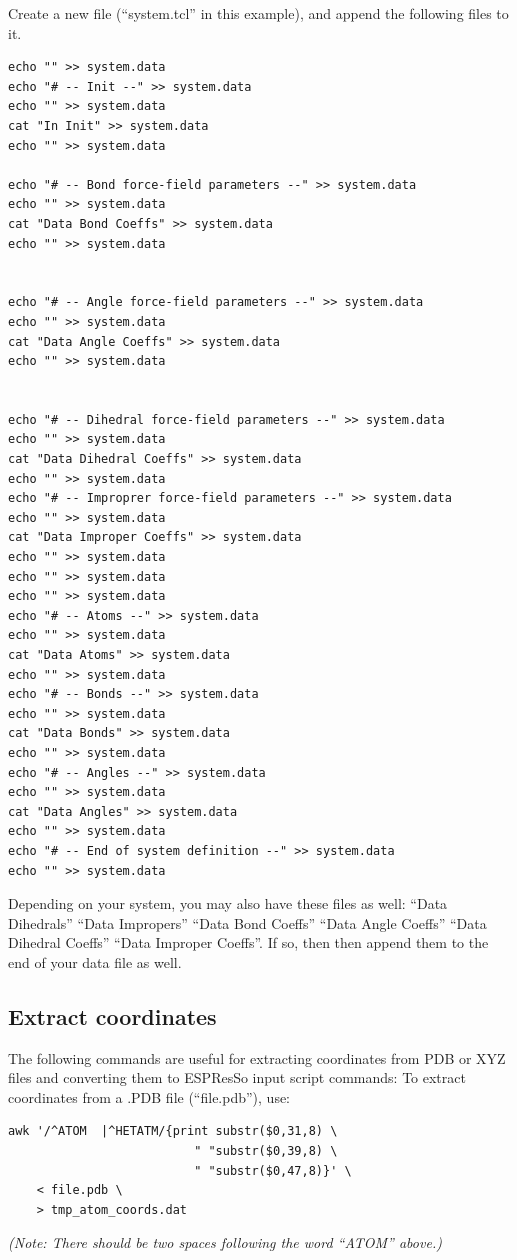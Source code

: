\documentclass[11pt]{article}
\begin{document}
Create a new file (``system.tcl'' in this example), and append the following files to it.

\begin{verbatim}
echo "" >> system.data
echo "# -- Init --" >> system.data
echo "" >> system.data
cat "In Init" >> system.data
echo "" >> system.data

echo "# -- Bond force-field parameters --" >> system.data
echo "" >> system.data
cat "Data Bond Coeffs" >> system.data
echo "" >> system.data


echo "# -- Angle force-field parameters --" >> system.data
echo "" >> system.data
cat "Data Angle Coeffs" >> system.data
echo "" >> system.data


echo "# -- Dihedral force-field parameters --" >> system.data
echo "" >> system.data
cat "Data Dihedral Coeffs" >> system.data
echo "" >> system.data
echo "# -- Improprer force-field parameters --" >> system.data
echo "" >> system.data
cat "Data Improper Coeffs" >> system.data
echo "" >> system.data
echo "" >> system.data
echo "" >> system.data
echo "# -- Atoms --" >> system.data
echo "" >> system.data
cat "Data Atoms" >> system.data
echo "" >> system.data
echo "# -- Bonds --" >> system.data
echo "" >> system.data
cat "Data Bonds" >> system.data
echo "" >> system.data
echo "# -- Angles --" >> system.data
echo "" >> system.data
cat "Data Angles" >> system.data
echo "" >> system.data
echo "# -- End of system definition --" >> system.data
echo "" >> system.data
\end{verbatim}

Depending on your system, you may also have these files as well:
``Data Dihedrals''
``Data Impropers''
``Data Bond Coeffs''
``Data Angle Coeffs''
``Data Dihedral Coeffs''
``Data Improper Coeffs''. 
If so, then then append them to the end of your data file as well.

\subsection{Extract coordinates}
The following commands are useful for extracting coordinates from PDB or XYZ
files and converting them to ESPResSo input script commands:
To extract coordinates from a .PDB file (``file.pdb''), use:

\begin{verbatim}
awk '/^ATOM  |^HETATM/{print substr($0,31,8) \
                          " "substr($0,39,8) \
                          " "substr($0,47,8)}' \
    < file.pdb \
    > tmp_atom_coords.dat
\end{verbatim}
\textit{(Note: There should be two spaces following the word ``ATOM'' above.)}
\end{document}
